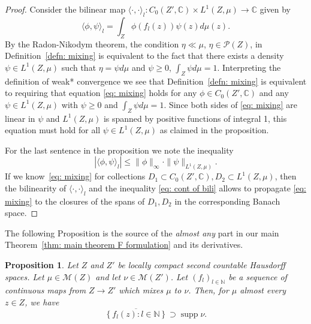 \documentclass[reqno,11pt, twoside]{amsart}
\theoremstyle{plain}
\newtheorem{prop}[thm]{Proposition}
\theoremstyle{definition}
\theoremstyle{definition}
\theoremstyle{remark}
\numberwithin{equation}{section}
\newcommand\ca[1]{\mathcal{#1}}
\newcommand{\N}{{\mathbb{N}}}
\newcommand{\cP}{\mathcal{P}}
\newcommand{\bC}{\mathbb{C}}
\newcommand\norm[1]{\|#1\|}
\newcommand\idist[1]{\langle#1\rangle}
\newcommand\av[1]{|#1|}
\newcommand\on[1]{\operatorname{#1}}
\begin{document}
\begin{proof}
Consider the bilinear map $\idist{\cdot, \cdot}_l:C_0(Z',\bC)\times L^1(Z,\mu)\to \bC$ given by
$$\idist{\phi,\psi}_l=\int_Z\phi(f_l(z))\psi(z)d\mu(z).$$
By the Radon-Nikodym theorem, the condition $\eta\ll \mu$, $\eta\in \cP(Z)$, in Definition~\ref{defn: mixing} is equivalent to the fact that there exists a density $\psi\in L^1(Z,\mu)$ such that $\eta = \psi d\mu$ and $\psi\ge0$, $\int_Z\psi d\mu=1.$
Interpreting the definition of weak* convergence we see that Definition~\ref{defn: mixing} is equivalent to requiring that equation
\eqref{eq: mixing} holds for any $\phi\in C_0(Z',\bC)$ and any 
$\psi\in L^1(Z,\mu)$ with $\psi\ge0$ and $\int_Z \psi d\mu =1$.
Since both sides of \eqref{eq: mixing} are linear in $\psi$ and $L^1(Z,\mu)$ is spanned by positive functions of integral 1, this equation must hold for all
$\psi\in L^1(Z,\mu)$ as claimed in the proposition. 

For the last sentence in the proposition we note the inequality
\begin{equation}\label{eq: cont of bili}
\av{\idist{\phi,\psi}_l}\le \norm{\phi}_\infty \cdot \norm{\psi}_{L^1(Z,\mu)}.
\end{equation}
If we know~\eqref{eq: mixing} for collections $D_1\subset C_0(Z',\bC), D_2\subset L^1(Z,\mu)$, then the bilinearity of $\idist{\cdot,\cdot}_l$ and the inequality \eqref{eq: cont of bili} allows to propagate \eqref{eq: mixing} to the closures of the spans of $D_1,D_2$ in the corresponding Banach space.

\end{proof}
The following Proposition is the source of the \textit{almost any} part in
our main Theorem~\ref{thm: main theorem F formulation} and its derivatives. 
\begin{prop}\label{prop: mixing implies density}
    Let $Z$ and $Z'$ be locally compact second countable Hausdorff spaces. Let $\mu \in \ca{M}(Z)$ and let $\nu \in \ca{M}(Z')$. Let $(f_l)_{l \in \N}$ be a sequence of continuous maps from $Z \to Z'$ which mixes $\mu$ to $\nu$.
    Then, for $\mu$ almost every $z \in Z$, we have
    \begin{equation*}
        \overline{\left\lbrace f_l(z): l \in \N \right\rbrace} \supset \on{supp} \nu.
    \end{equation*}
\end{prop}
\end{document}
